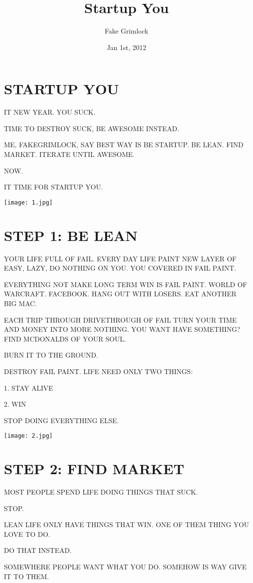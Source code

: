 \documentclass{article}
\title{Startup You}
\author{Fake Grimlock}
\date{Jan 1st, 2012}
\begin{document}
\section*{STARTUP YOU}

IT NEW YEAR. YOU SUCK.

TIME TO DESTROY SUCK, BE AWESOME INSTEAD.

ME, FAKEGRIMLOCK, SAY BEST WAY IS BE STARTUP. BE LEAN. FIND MARKET.
ITERATE UNTIL AWESOME.

NOW.

IT TIME FOR STARTUP YOU.

\texttt{[image: 1.jpg]}

\section*{STEP 1: BE LEAN}

YOUR LIFE FULL OF FAIL. EVERY DAY LIFE PAINT NEW LAYER OF EASY, LAZY,
DO NOTHING ON YOU. YOU COVERED IN FAIL PAINT.

EVERYTHING NOT MAKE LONG TERM WIN IS FAIL PAINT. WORLD OF WARCRAFT.
FACEBOOK. HANG OUT WITH LOSERS. EAT ANOTHER BIG MAC.

EACH TRIP THROUGH DRIVETHROUGH OF FAIL TURN YOUR TIME AND MONEY INTO
MORE NOTHING. YOU WANT HAVE SOMETHING? FIND MCDONALDS OF YOUR SOUL.

BURN IT TO THE GROUND.

DESTROY FAIL PAINT. LIFE NEED ONLY TWO THINGS:

1. STAY ALIVE

2. WIN

STOP DOING EVERYTHING ELSE.

\texttt{[image: 2.jpg]}

\section*{STEP 2: FIND MARKET}

MOST PEOPLE SPEND LIFE DOING THINGS THAT SUCK.

STOP.

LEAN LIFE ONLY HAVE THINGS THAT WIN. ONE OF THEM THING YOU LOVE TO DO.

DO THAT INSTEAD.

SOMEWHERE PEOPLE WANT WHAT YOU DO. SOMEHOW IS WAY GIVE IT TO THEM.
\end{document}
